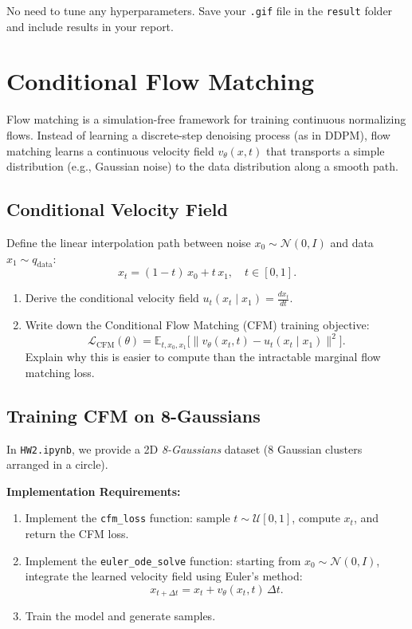 \documentclass[11pt]{article}
\begin{document}
No need to tune any hyperparameters. Save your \texttt{.gif} file in the \texttt{result} folder and include results in your report.

\hrulefill

\section{Conditional Flow Matching}

Flow matching is a simulation-free framework for training continuous normalizing flows. Instead of learning a discrete-step denoising process (as in DDPM), flow matching learns a continuous velocity field \( v_\theta(x, t) \) that transports a simple distribution (e.g., Gaussian noise) to the data distribution along a smooth path.

\subsection{Conditional Velocity Field}

Define the linear interpolation path between noise \( x_0 \sim \mathcal{N}(0, I) \) and data \( x_1 \sim q_{\mathrm{data}} \):
\[
x_t = (1 - t)\, x_0 + t\, x_1, \quad t \in [0, 1].
\]

\begin{enumerate}[label=(\alph*)]
    \item Derive the conditional velocity field \( u_t(x_t \mid x_1) = \frac{dx_t}{dt} \).
    \item Write down the Conditional Flow Matching (CFM) training objective:
    \[
    \mathcal{L}_{\mathrm{CFM}}(\theta) = \mathbb{E}_{t, x_0, x_1}\bigl[\| v_\theta(x_t, t) - u_t(x_t \mid x_1) \|^2\bigr].
    \]
    Explain why this is easier to compute than the intractable marginal flow matching loss.
\end{enumerate}

\subsection{Training CFM on 8-Gaussians}

In \texttt{HW2.ipynb}, we provide a 2D \emph{8-Gaussians} dataset (8 Gaussian clusters arranged in a circle).

\textbf{Implementation Requirements:}
\begin{enumerate}
    \item Implement the \texttt{cfm\_loss} function: sample \( t \sim \mathcal{U}[0,1] \), compute \( x_t \), and return the CFM loss.
    \item Implement the \texttt{euler\_ode\_solve} function: starting from \( x_0 \sim \mathcal{N}(0, I) \), integrate the learned velocity field using Euler's method:
    \[
    x_{t + \Delta t} = x_t + v_\theta(x_t, t)\, \Delta t.
    \]
    \item Train the model and generate samples.
\end{enumerate}
\end{document}
